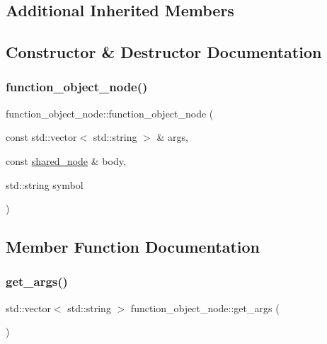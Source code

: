 \subsection*{Additional Inherited Members}


\subsection{Constructor \& Destructor Documentation}
\mbox{\label{classjawe_1_1function__object__node_ae7bff56873ee72d59fd2aa248c6af950}} 
\subsubsection{\texorpdfstring{function\+\_\+object\+\_\+node()}{function\_object\_node()}}
{\footnotesize\ttfamily function\+\_\+object\+\_\+node\+::function\+\_\+object\+\_\+node (\begin{DoxyParamCaption}\item[{const std\+::vector$<$ std\+::string $>$ \&}]{args,  }\item[{const \hyperlink{namespacejawe_a3f307481d921b6cbb50cc8511fc2b544}{shared\+\_\+node} \&}]{body,  }\item[{std\+::string}]{symbol }\end{DoxyParamCaption})}



\subsection{Member Function Documentation}
\mbox{\label{classjawe_1_1function__object__node_a70cac84994ab03b0bf6738b5916ccb0a}} 
\subsubsection{\texorpdfstring{get\+\_\+args()}{get\_args()}}
{\footnotesize\ttfamily std\+::vector$<$ std\+::string $>$ function\+\_\+object\+\_\+node\+::get\+\_\+args (\begin{DoxyParamCaption}{ }\end{DoxyParamCaption})}

